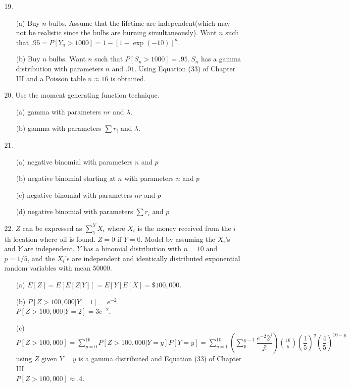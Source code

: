 \begin{enumerate}
	\item[19.]  \begin{enumerate}
		\item[(a)] Buy $n$ bulbs. Assume that the lifetime are independent(which may not be realistic since the bulbs are burning simultaneously).  Want $n$ such that $.95=P[Y_n> 1000]=1-[1-\exp(-10)]^n$.
		\item[(b)] Buy $n$ bulbs.  Want $n$ such that $P[S_n> 1000]=.95.\ S_n$ has a gamma distribution with parameters $n$ and $.01$.  Using Equation (33) of Chapter III and a Poisson table $n\approx 16$ is obtained.
	\end{enumerate}

	\item[20.] Use the moment generating function technique.
		\begin{enumerate}
			\item[(a)] gamma with parameters $nr$ and $\lambda$.
			\item[(b)] gamma with parameters $\sum r_i$ and $\lambda$.
		\end{enumerate}

	\item[21.] \begin{enumerate}
		\item[(a)] negative binomial with parameters $n$ and $p$
		\item[(b)] negative binomial starting at $n$ with parameters $n$ and $p$
		\item[(c)] negative binomial with parameters $nr$ and $p$
		\item[(d)] negative binomial with parameters $\sum r_i$ and $p$
	\end{enumerate}

	\item[22.] $Z$ can be expressed as $\displaystyle\sum_{1}^{Y}X_i$ where $X_i$ is the money received from the $i$th location where oil is found. $Z=0$ if $Y=0$. Model by assuming the $X_i$'s and $Y$ are independent. $Y$ has a binomial distribution with $n=10$ and $p=1/5$, and the $X_i$'s are independent and identically distributed exponential random variables with mean 50000. 
	\begin{enumerate}
		\item[(a)] $E[Z] = E[E[Z\vert Y]] = E[Y]E[X] = \$100,000$.
		\item[(b)] $P[Z>100,\!000\vert Y=1] = e^{-2}$. \\
		$P[Z>100,\!000\vert Y=2] = 3e^{-2}$.
		\item[(c)] $P[Z>100,\!000] = \displaystyle\sum_{y=0}^{10}P[Z>100,\!000\vert Y=y]P[Y=y] = \sum_{y=1}^{10}\left(\sum_{0}^{y-1}\dfrac{e^{-2}2^j}{j!}\right){10\choose y}\left(\dfrac{1}{5}\right)^y\left(\dfrac{4}{5}\right)^{10-y}$ using $Z$ given $Y=y$ is a gamma distributed and Equation (33) of Chapter III. \\
		$P[Z>100,\!000]\approx .4$. 
	\end{enumerate}


\end{enumerate}
